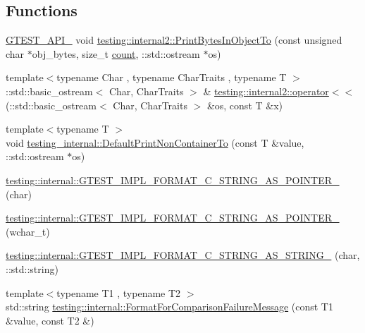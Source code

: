 \subsection*{Functions}
\begin{DoxyCompactItemize}
\item 
\hyperlink{gtest-port_8h_aa73be6f0ba4a7456180a94904ce17790}{G\+T\+E\+S\+T\+\_\+\+A\+P\+I\+\_\+} void \hyperlink{namespacetesting_1_1internal2_a9fbf8e07c0f94dc74d6ef5e56cd3c553}{testing\+::internal2\+::\+Print\+Bytes\+In\+Object\+To} (const unsigned char $\ast$obj\+\_\+bytes, size\+\_\+t \hyperlink{gmock__stress__test_8cc_afd9db40e3361ae09188795e8cbe19752}{count}, \+::std\+::ostream $\ast$os)
\item 
{\footnotesize template$<$typename Char , typename Char\+Traits , typename T $>$ }\\\+::std\+::basic\+\_\+ostream$<$ Char, Char\+Traits $>$ \& \hyperlink{namespacetesting_1_1internal2_a07dbe129beb8952074f04b599dfce39b}{testing\+::internal2\+::operator$<$$<$} (\+::std\+::basic\+\_\+ostream$<$ Char, Char\+Traits $>$ \&os, const T \&x)
\item 
{\footnotesize template$<$typename T $>$ }\\void \hyperlink{namespacetesting__internal_a3f49d3d0c996242f9d383c850097a656}{testing\+\_\+internal\+::\+Default\+Print\+Non\+Container\+To} (const T \&value, \+::std\+::ostream $\ast$os)
\item 
\hyperlink{namespacetesting_1_1internal_a3682f962ae0ec1c0eca6444ca0a09e91}{testing\+::internal\+::\+G\+T\+E\+S\+T\+\_\+\+I\+M\+P\+L\+\_\+\+F\+O\+R\+M\+A\+T\+\_\+\+C\+\_\+\+S\+T\+R\+I\+N\+G\+\_\+\+A\+S\+\_\+\+P\+O\+I\+N\+T\+E\+R\+\_\+} (char)
\item 
\hyperlink{namespacetesting_1_1internal_a85e08f00d443221e529a0a85a90fbaeb}{testing\+::internal\+::\+G\+T\+E\+S\+T\+\_\+\+I\+M\+P\+L\+\_\+\+F\+O\+R\+M\+A\+T\+\_\+\+C\+\_\+\+S\+T\+R\+I\+N\+G\+\_\+\+A\+S\+\_\+\+P\+O\+I\+N\+T\+E\+R\+\_\+} (wchar\+\_\+t)
\item 
\hyperlink{namespacetesting_1_1internal_aeac30230dcc362221bdd07d61eaa4ec1}{testing\+::internal\+::\+G\+T\+E\+S\+T\+\_\+\+I\+M\+P\+L\+\_\+\+F\+O\+R\+M\+A\+T\+\_\+\+C\+\_\+\+S\+T\+R\+I\+N\+G\+\_\+\+A\+S\+\_\+\+S\+T\+R\+I\+N\+G\+\_\+} (char, \+::std\+::string)
\item 
{\footnotesize template$<$typename T1 , typename T2 $>$ }\\std\+::string \hyperlink{namespacetesting_1_1internal_a91ab078f10adc669f09b7f604975c518}{testing\+::internal\+::\+Format\+For\+Comparison\+Failure\+Message} (const T1 \&value, const T2 \&)

\end{DoxyCompactItemize}

